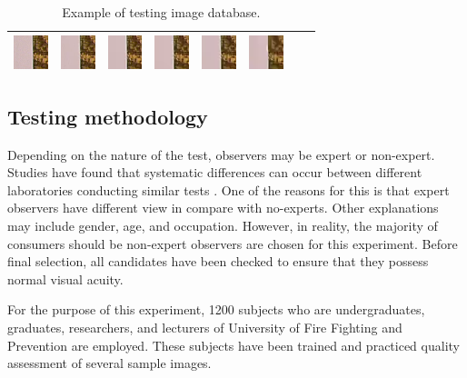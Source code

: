 \begin{table}[H]
\begin{tabular}{| c | c | c | c | c | c | c | c |}
    \includegraphics[height=1cm]{figures/31.png}                                                  & \includegraphics[height=1cm]{figures/32.png}     & \includegraphics[height=1cm]{figures/33.png}    & \includegraphics[height=1cm]{figures/34.png}    & \includegraphics[height=1cm]{figures/35.png}    & \includegraphics[height=1cm]{figures/36.png}    &      &      \\ \hline
  \end{tabular}
  \caption{Example of testing image database.}
  \label{tab:exid}
\end{table}

\subsection{Testing methodology}

Depending on the nature of the test, observers may be expert or non-expert. Studies have found that systematic differences can occur between different laboratories conducting similar tests \cite{Bt2002}. One of the reasons for this is that expert observers have different view in compare with no-experts. Other explanations may include gender, age, and occupation. However, in reality, the majority of consumers should be non-expert observers are chosen for this experiment. Before final selection, all candidates have been checked to ensure that they possess normal visual acuity.

For the purpose of this experiment, 1200 subjects who are undergraduates, graduates, researchers, and lecturers of University of Fire Fighting and Prevention are employed. These subjects have been trained and practiced quality assessment of several sample images.


